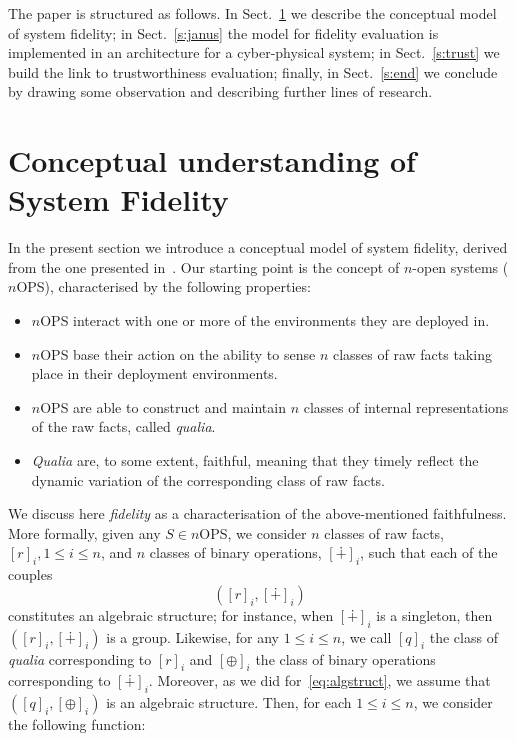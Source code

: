 \documentclass{article}
\begin{document}
The paper is structured as follows. In Sect.~\ref{s:fidel} we describe the conceptual model of system fidelity; in Sect.~\ref{s:janus} the model for fidelity evaluation is implemented in an architecture for a cyber-physical system;
in Sect.~\ref{s:trust} we build the link to trustworthiness evaluation; finally, in Sect.~\ref{s:end}
we conclude by drawing some observation and describing further lines of research.




\section{Conceptual understanding of System Fidelity}\label{s:fidel}

In the present section we introduce a conceptual model of system fidelity, derived from the one presented in~\cite{DF14a}. Our starting point is the concept of $n$-open systems ($n$OPS), characterised by the following properties:

\begin{itemize}
\item $n$OPS interact with one or more of the environments they are deployed in.
\item $n$OPS base their action on the ability to sense $n$ classes of raw facts taking place
      in their deployment environments.
\item $n$OPS are able to construct and maintain $n$ classes of 
      internal representations of the raw facts, called \textit{qualia}.
\item \textit{Qualia} are, to some extent, faithful, meaning that they timely
      reflect the dynamic variation of the corresponding class of raw facts.
\end{itemize}

We discuss here \emph{fidelity\/} as a characterisation of the above-mentioned faithfulness.
More formally, given any $S\in n$OPS, we consider $n$ classes of raw facts, $[r]_i, 1\le i\le n$, and $n$
classes of binary operations, $[\dotplus]_i$, such that each of the couples 
\begin{equation}
([r]_i, [\dotplus]_i)\label{eq:algstruct}
\end{equation}
constitutes an algebraic structure; for instance, when $[\dotplus]_i$ is a singleton,
then $([r]_i, [\dotplus]_i)$ is a group.
Likewise, for any $1\le i\le n$, we call $[q]_i$ the class of \textit{qualia\/} corresponding to $[r]_i$ and
$[\oplus]_i$ the class of binary operations corresponding to $[\dotplus]_i$.
Moreover, as we did for~\eqref{eq:algstruct}, we assume that $([q]_i, [\oplus]_i)$ is an
algebraic structure. Then, for each $1\le i\le n$, we consider the following function:
\end{document}

